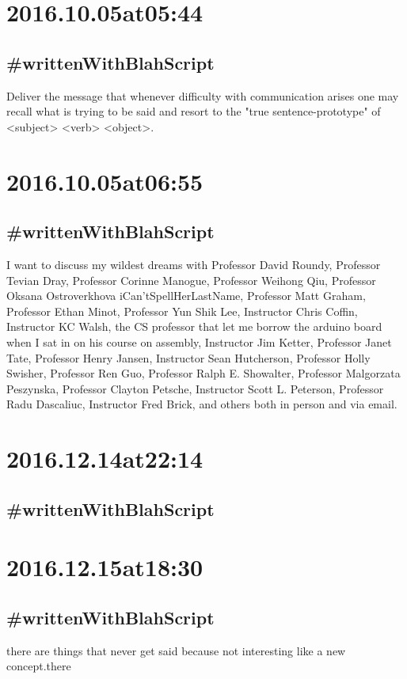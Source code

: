 \section*{ 2016.10.05at05:44 }
\subsection*{\#writtenWithBlahScript }
Deliver the message that whenever difficulty with communication arises one may recall what is trying to be said and resort to the "true sentence-prototype" of <subject> <verb> <object>.

\section*{ 2016.10.05at06:55 }
\subsection*{\#writtenWithBlahScript }
I want to discuss my wildest dreams with Professor David Roundy, Professor Tevian Dray, Professor Corinne Manogue, Professor Weihong Qiu, Professor Oksana Ostroverkhova iCan'tSpellHerLastName, Professor Matt Graham, Professor Ethan Minot, Professor Yun Shik Lee, Instructor Chris Coffin, Instructor KC Walsh, the CS professor that let me borrow the arduino board when I sat in on his course on assembly, Instructor Jim Ketter, Professor Janet Tate, Professor Henry Jansen, Instructor Sean Hutcherson, Professor Holly Swisher, Professor Ren Guo, Professor Ralph E. Showalter, Professor Malgorzata Peszynska, Professor Clayton Petsche, Instructor Scott L. Peterson, Professor Radu Dascaliuc, Instructor Fred Brick, and others both in person and via email.

\section*{ 2016.12.14at22:14 }
\subsection*{\#writtenWithBlahScript }


\section*{ 2016.12.15at18:30 }
\subsection*{\#writtenWithBlahScript }
there are things that never get said because not interesting like a new concept.there

